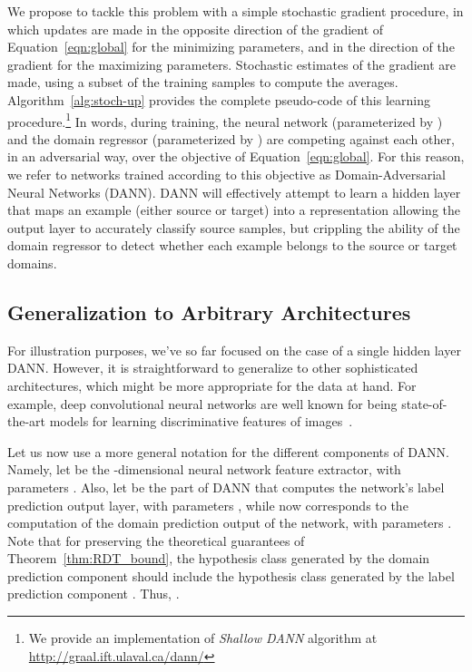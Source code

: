 \documentclass[twoside,11pt]{article}
\begin{document}
We propose to tackle this problem with a simple stochastic gradient procedure, in which updates are made in the opposite direction of the gradient of Equation~\eqref{eqn:global} for the minimizing parameters, and in the direction of the gradient for the maximizing parameters. Stochastic estimates of the gradient are made, using a subset of the training samples to compute the averages. Algorithm~\ref{alg:stoch-up} provides the complete pseudo-code of this learning procedure.\footnote{We provide an implementation of \emph{Shallow DANN} algorithm at 
\url{http://graal.ift.ulaval.ca/dann/}}
In words, during training, the neural network (parameterized by ) and the domain regressor (parameterized by ) are competing
against each other, in an adversarial way, over the objective of Equation~\eqref{eqn:global}. 
For this reason, we refer to networks trained according to this objective
as Domain-Adversarial Neural Networks (DANN).
DANN will effectively attempt to learn a hidden layer  that maps an example (either source or target) into a representation allowing the output layer  to accurately classify source samples, but crippling the ability of the domain regressor  to detect whether each example belongs to the source or target domains.



\subsection{Generalization to Arbitrary Architectures}
\label{section:deep_DANN}




For illustration purposes, we've so far focused on the case of a single hidden layer DANN. However, it is straightforward to generalize to other sophisticated architectures, which might be more appropriate for the data at hand. For example,  deep convolutional neural networks are well known for being state-of-the-art models for learning discriminative features of images~\citep{KrizhevskyA2012}.

Let us now use a more general notation for the different components of DANN. Namely, let  be the -dimensional neural network feature extractor, with parameters . Also, let  be the part of DANN that computes the network's label prediction output layer, with parameters , while  now corresponds to the computation of the domain prediction output of the network, with parameters .
Note that for preserving the theoretical guarantees of Theorem~\ref{thm:RDT_bound}, the hypothesis class  generated by the domain prediction component  should include the hypothesis class  generated by the label prediction component . Thus, .
\end{document}
